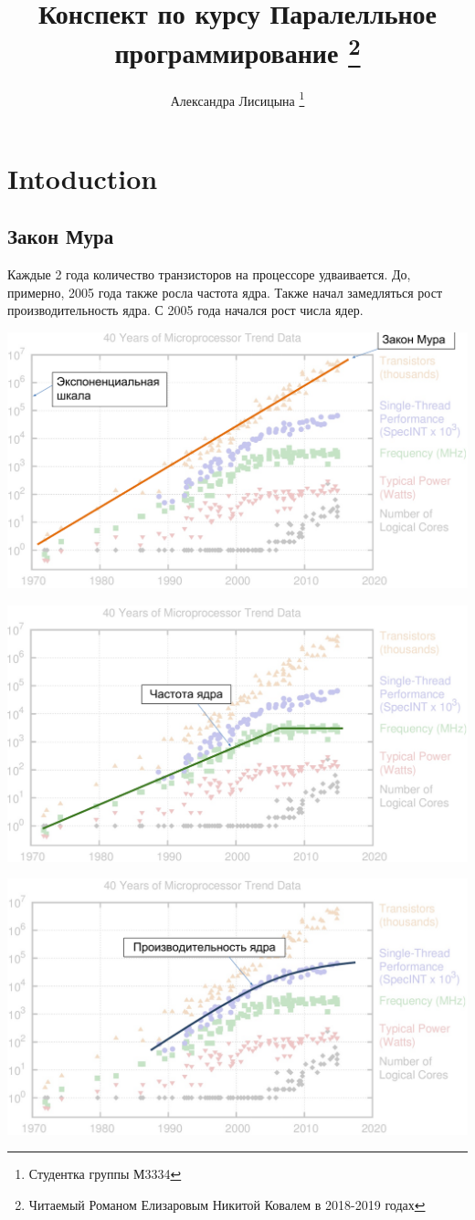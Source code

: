 \documentclass[10pt,a4paper,oneside,titlepage]{article}
\title{Конспект по курсу Паралелльное программирование \thanks{Читаемый Романом Елизаровым  Никитой Ковалем в 2018-2019 годах}}
\author{Александра Лисицына \thanks{Студентка группы М3334}}
\begin{document}
	
\maketitle

\tableofcontents

\clearpage	
\section{Intoduction}
\subsection{Закон Мура}
Каждые 2 года количество транзисторов на процессоре удваивается.
До, примерно, 2005 года также росла частота ядра. Также начал замедляться рост производительность ядра. С 2005 года начался рост числа ядер.

\includegraphics*[scale=0.5]{Mura1}

\includegraphics*[scale=0.5]{Mura2}

\includegraphics*[scale=0.5]{Mura3}
\end{document}
